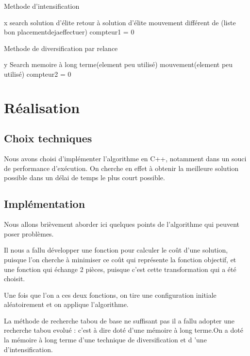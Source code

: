 \documentclass{report}
\begin{document}
\begin{algorithm}
\caption{Methode d'intensification}
\begin{algorithmic}
\REQUIRE x
\ENSURE 
{}
\STATE search solution d'élite
\STATE retour à solution d'élite
\STATE mouvement différent de (liste bon placementdejaeffectuer)
\STATE compteur1 = 0
\ENDIF
\end{algorithmic}
\end{algorithm}

\begin{algorithm}
\caption{Methode de diversification par relance}
\begin{algorithmic}
\REQUIRE y
\ENSURE 
{}
\STATE Search memoire à long terme(element peu utilisé)
\STATE mouvement(element peu utilisé)
\STATE compteur2 = 0
\ENDIF
\end{algorithmic}
\end{algorithm}

\section{Réalisation}
\subsection{Choix techniques}
Nous avons choisi d'implémenter l'algorithme en C++, notamment dans un souci de performance d’exécution. On cherche en effet à obtenir la meilleure solution possible dans un délai de temps le plus court possible. 

\subsection{Implémentation}
 Nous allons brièvement aborder ici quelques points de l’algorithme qui peuvent poser problèmes.

Il nous a fallu développer une fonction pour calculer le coût d'une solution, puisque l'on cherche à minimiser ce coût qui représente la fonction objectif, et une fonction qui échange 2 pièces, puisque c'est cette transformation qui a été choisit.

Une fois que l'on a ces deux fonctions, on tire une configuration initiale aléatoirement et on applique l'algorithme.

La méthode de recherche tabou de base ne suffisant pas il a fallu adopter une recherche tabou evolué : c'est à dire doté d'une mémoire à long terme.On a doté la mémoire à long terme d'une technique de diversification et d 'une d'intensification.
\end{document}
